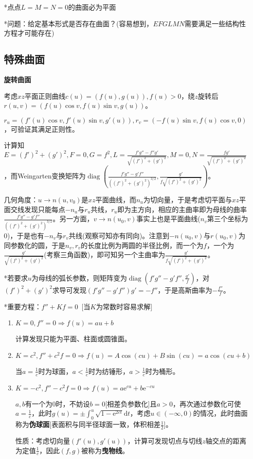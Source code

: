\documentclass[a4paper,UTF8,fontset=windows]{ctexart}
\DeclareMathOperator{\diag}{diag}
\begin{document}
*点点$L=M=N=0$的曲面必为平面

*问题：给定基本形式是否存在曲面？(容易想到，$EFGLMN$需要满足一些结构性方程才可能存在)

\subsection{特殊曲面}
\textbf{旋转曲面}

考虑$xz$平面正则曲线$c(u)=(f(u),g(u)),f(u)>0$，绕$z$旋转后$r(u,v)=(f(u)\cos v,f(u)\sin v,g(u))$。

$r_u=(f'(u)\cos v,f'(u)\sin v,g'(u)),r_v=(-f(u)\sin v,f(u)\cos v,0)$，可验证其满足正则性。

计算知$E=(f')^2+(g')^2,F=0,G=f^2,L=\frac{f'g''-f''g'}{\sqrt{(f')^2+(g')^2}},M=0,N=\frac{fg'}{\sqrt{(f')^2+(g')^2}}$，而Weingarten变换矩阵为$\diag\left(\frac{f'g''-g'f''}{((f')^2+(g')^2)^{3/2}},\frac{g'}{f\sqrt{(f')^2+(g')^2}}\right)$。

几何角度：$u\to n(u,v_0)$是$xz$平面曲线，而$n_u$为切向量，于是考虑切平面与$xz$平面交线发现只能每点$-n_u$与$r_u$共线，$r_u$即为主方向，相应的主曲率即为母线的曲率$\frac{f'g''-g'f''}{((f')^2+(g')^2)^{3/2}}$。另一方面，$v\to n(u_0,v)$事实上也是平面曲线($n_v$第三个坐标为0)，于是也有$-n_v$与$r_v$共线(观察可知亦有同向)。注意到$-n(u_0,v)$与$r(u_0,v)$为同参数化的圆，于是$n_v,r_v$的长度比例为两圆的半径比例，而一个为$f$，一个为$\frac{g'}{\sqrt{(f')^2+(g')^2}}$(考察三角函数)，即可知另一个主曲率为$\frac{g'}{f\sqrt{(f')^2+(g')^2}}$。

*若要求$u$为母线的弧长参数，则矩阵变为$\diag(f'g''-g'f'',\frac{g'}{f})$，对$(f')^2+(g')^2$求导可发现$(f'g''-g'f'')g'=-f''$，于是高斯曲率为$-\frac{f''}{f}$。

*重要方程：$f''+Kf=0$\ [当$K$为常数时容易求解]

\begin{enumerate}
\item
$K=0,f''=0\Longrightarrow f(u)=au+b$

计算发现只能为平面、柱面或圆锥面。

\item
$K=c^2,f''+c^2f=0\Longrightarrow f(u)=A\cos(cu)+B\sin(cu)=a\cos(cu+b)$

当$a=\frac{1}{c}$时为球面，$a<\frac{1}{c}$时为纺锤形，$a>\frac{1}{c}$时为桶形。

\item
$K=-c^2,f''-c^2f=0\Longrightarrow f(u)=a\mathrm{e}^{cu}+b\mathrm{e}^{-cu}$

$a,b$有一个为0时，不妨设$b=0$[相差负参数化]且$a>0$，再次通过参数化可使$a=\frac{1}{c}$，此时$g(u)=\pm\int_0^u\sqrt{1-\mathrm{e}^{2ct}}\mathrm{d}t$，考虑$u\in(-\infty,0)$的情况，此时曲面称为\textbf{伪球面}[表面积与同半径球面一致，体积相差$\frac{1}{2}$]。

性质：考虑切向量$(f'(u),g'(u))$，计算可发现切点与切线$z$轴交点的距离为定值$\frac{1}{c}$，因此$(f,g)$被称为\textbf{曳物线}。
\end{enumerate}
\end{document}

